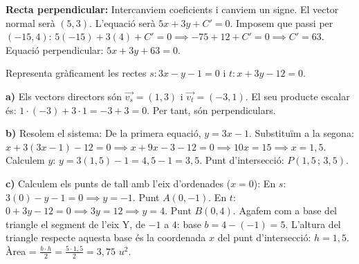 \documentclass[12pt,a4paper,answers]{exam} %
\begin{document}
\begin{questions}
\begin{solution}
        \textbf{Recta perpendicular:} Intercanviem coeficients i canviem un signe. El vector normal serà $(5, 3)$. L'equació serà $5x + 3y + C' = 0$.
        Imposem que passi per $(-15, 4)$: $5(-15) + 3(4) + C' = 0 \implies -75 + 12 + C' = 0 \implies C' = 63$.
        Equació perpendicular: $5x + 3y + 63 = 0$.
    \end{solution}

    \question Representa gràficament les rectes $s: 3x-y-1=0$ i $t: x+3y-12=0$.

    \begin{solution}
        \textbf{a)} Els vectors directors són $\vec{v_s} = (1, 3)$ i $\vec{v_t} = (-3, 1)$. 
        El seu producte escalar és: $1 \cdot (-3) + 3 \cdot 1 = -3 + 3 = 0$. Per tant, són perpendiculars.
        
        \textbf{b)} Resolem el sistema: 
        De la primera equació, $y = 3x - 1$. 
        Substituïm a la segona: $x + 3(3x - 1) - 12 = 0 \implies x + 9x - 3 - 12 = 0 \implies 10x = 15 \implies x = 1,5$.
        Calculem $y$: $y = 3(1,5) - 1 = 4,5 - 1 = 3,5$.
        Punt d'intersecció: $P(1,5 \,;\, 3,5)$.
        
        \textbf{c)} Calculem els punts de tall amb l'eix d'ordenades ($x=0$):
        En $s$: $3(0) - y - 1 = 0 \implies y = -1$. Punt $A(0, -1)$.
        En $t$: $0 + 3y - 12 = 0 \implies 3y = 12 \implies y = 4$. Punt $B(0, 4)$.
        Agafem com a base del triangle el segment de l'eix Y, de $-1$ a $4$: base $b = 4 - (-1) = 5$.
        L'altura del triangle respecte aquesta base és la coordenada $x$ del punt d'intersecció: $h = 1,5$.
        Àrea = $\frac{b \cdot h}{2} = \frac{5 \cdot 1,5}{2} = 3,75$ $u^2$.
    \end{solution}


\end{questions}
\end{document}
